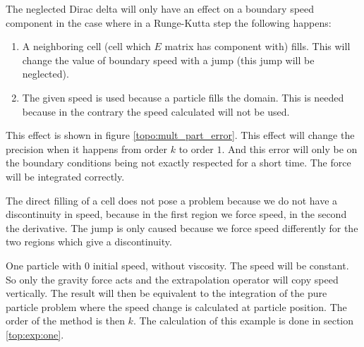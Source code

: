 The neglected Dirac delta will only have an effect on a boundary speed component in the case where in a Runge-Kutta step the following happens:
\begin{enumerate}
	\item A neighboring cell (cell which $E$ matrix has component with) fills.
	This will change the value of boundary speed with a jump (this jump will be neglected).
	\item The given speed is used because a particle fills the domain.
	This is needed because in the contrary the speed calculated will not be used.
\end{enumerate}
This effect is shown in figure \ref{topo:mult_part_error}.
This effect will change the precision when it happens from order $k$ to order $1$.
And this error will only be on the boundary conditions being not exactly respected for a short time.
The force will be integrated correctly.

The direct filling of a cell does not pose a problem because we do not have a discontinuity in speed, because in the first region we force speed,
in the second the derivative.
The jump is only caused because we force speed differently for the two regions which give a discontinuity.

\begin{example}
One particle with 0 initial speed, without viscosity.
The speed will be constant. So only the gravity force acts and the extrapolation operator will copy speed vertically.
The result will then be equivalent to the integration of the pure particle problem where the speed change is calculated at particle position.
The order of the method is then $k$.
The calculation of this example is done in section \ref{top:exp:one}.
\end{example}

